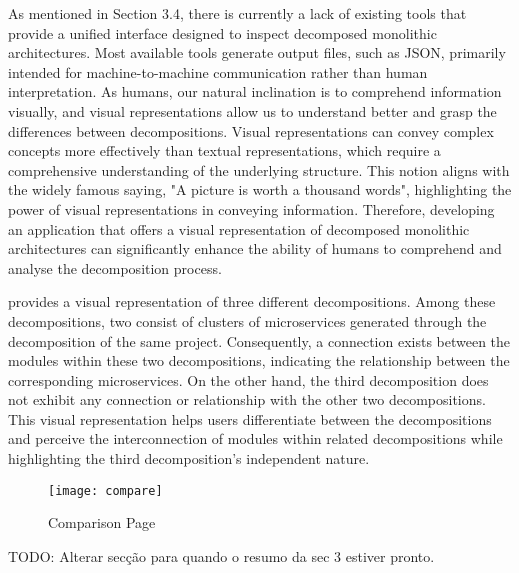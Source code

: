 As mentioned in Section 3.4, there is currently a lack of existing tools that
provide a unified interface designed to inspect decomposed monolithic
architectures. Most available tools generate output files, such as JSON,
primarily intended for machine-to-machine communication rather than human
interpretation. As humans, our natural inclination is to comprehend information
visually, and visual representations allow us to understand better and grasp
the differences between decompositions. Visual representations can convey
complex concepts more effectively than textual representations, which require a
comprehensive understanding of the underlying structure. This notion aligns
with the widely famous saying, "A picture is worth a thousand words",
highlighting the power of visual representations in conveying information.
Therefore, developing an application that offers a visual representation of
decomposed monolithic architectures can significantly enhance the ability of
humans to comprehend and analyse the decomposition process.

 provides a visual representation of three different
decompositions. Among these decompositions, two consist of clusters of
microservices generated through the decomposition of the same project.
Consequently, a connection exists between the modules within these two
decompositions, indicating the relationship between the corresponding
microservices. On the other hand, the third decomposition does not exhibit any
connection or relationship with the other two decompositions. This visual
representation helps users differentiate between the decompositions and
perceive the interconnection of modules within related decompositions while
highlighting the third decomposition's independent nature.

\begin{figure*}[!htb]
  \caption{Comparison Page} \label{fig:comparison_page}
  \centering
  \texttt{[image: compare]}
\end{figure*}

TODO: Alterar secção para quando o resumo da sec 3 estiver pronto.
